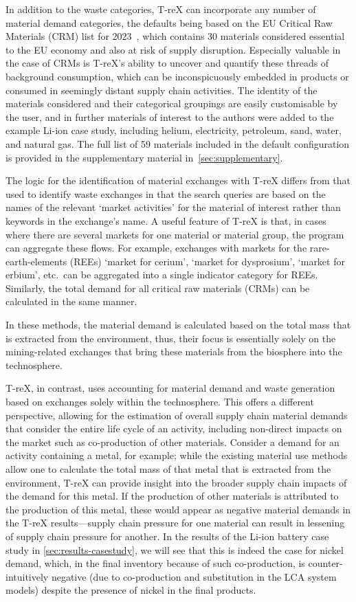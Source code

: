 \documentclass[a4paper,fleqn]{cas-dc}
\begin{document}
In addition to the waste categories, T-reX can incorporate any number of material demand categories, the defaults being based on the EU Critical Raw Materials (CRM) list for 2023~\citep{eu2023crmstudy}, which contains 30 materials considered essential to the EU economy and also at risk of supply disruption. Especially valuable in the case of CRMs is T-reX's ability to uncover and quantify these threads of background consumption, which can be inconspicuously embedded in products or consumed in seemingly distant supply chain activities. The identity of the materials considered and their categorical groupings are easily customisable by the user, and in further materials of interest to the authors were added to the example Li-ion case study, including helium, electricity, petroleum, sand, water, and natural gas. The full list of 59 materials included in the default configuration is provided in the supplementary material in~\autoref{sec:supplementary}.

The logic for the identification of material exchanges with T-reX differs from that used to identify waste exchanges in that the search queries are based on the names of the relevant `market activities' for the material of interest rather than keywords in the exchange's name. A useful feature of T-reX is that, in cases where there are several markets for one material or material group, the program can aggregate these flows. For example, exchanges with markets for the rare-earth-elements (REEs) `market for cerium', `market for dysprosium', `market for erbium', etc.\ can be aggregated into a single indicator category for REEs. Similarly, the total demand for all critical raw materials (CRMs) can be calculated in the same manner.

In these methods, the material demand is calculated based on the total mass that is extracted from the environment, thus, their focus is essentially solely on the mining-related exchanges that bring these materials from the biosphere into the technosphere.

T-reX, in contrast, uses accounting for material demand and waste generation based on exchanges solely within the technosphere. This offers a different perspective, allowing for the estimation of overall supply chain material demands that consider the entire life cycle of an activity, including non-direct impacts on the market such as co-production of other materials. Consider a demand for an activity containing a metal, for example; while the existing material use methods allow one to calculate the total mass of that metal that is extracted from the environment, T-reX can provide insight into the broader supply chain impacts of the demand for this metal. If the production of other materials is attributed to the production of this metal, these would appear as negative material demands in the T-reX results---supply chain pressure for one material can result in lessening of supply chain pressure for another. In the results of the Li-ion battery case study in \autoref{sec:results-casestudy}, we will see that this is indeed the case for nickel demand, which, in the final inventory because of such co-production, is counter-intuitively negative (due to co-production and substitution in the LCA system models) despite the presence of nickel in the final products.
\end{document}
